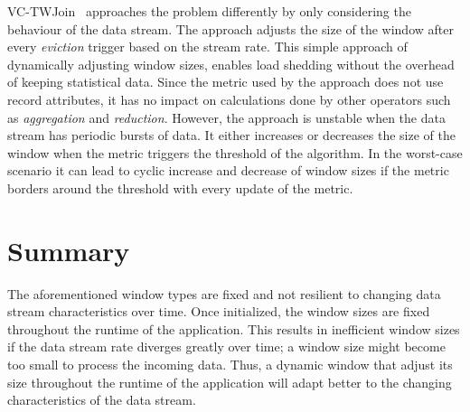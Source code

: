 VC-TWJoin~\cite{vctw_join} approaches the problem differently by only considering 
the behaviour of the data stream. The approach adjusts the size of the window 
after every \emph{eviction} trigger based on the stream rate. This simple approach 
of dynamically adjusting window sizes, enables load shedding without the overhead of 
keeping statistical data. Since the metric used by the approach does not use 
record attributes, it has no impact on calculations 
done by other operators such as \emph{aggregation} and \emph{reduction}.
However, the approach is unstable when the data stream has periodic bursts of data.
It either increases or decreases the size of the window when the metric triggers 
the threshold of the algorithm. In the worst-case scenario it can lead to cyclic increase and 
decrease of window sizes if the metric borders around the threshold with every 
update of the metric.


\section{Summary}%
\label{sec:Summary}

The aforementioned window types are fixed and not resilient to changing data stream characteristics over time. Once initialized, the window sizes 
are fixed throughout the runtime of the application. This results in inefficient 
window sizes if the data stream rate diverges greatly over time; a window size might become too small to process the incoming 
data. Thus, a dynamic window that adjust its size throughout the runtime of the application 
will adapt better to the changing characteristics of the data stream. 


